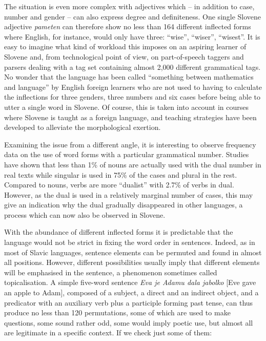 \begin{multicols}{2}
The situation is even more complex with adjectives which – in addition to case, number and gender – can also express degree and definiteness. One single Slovene adjective \textit{pameten} can therefore show no less than 164 different inflected forms where English, for instance, would only have three: ``wise'', ``wiser'', ``wisest''. It is easy to imagine what kind of workload this imposes on an aspiring learner of Slovene and, from technological point of view, on part-of-speech taggers and parsers dealing with a tag set containing almost 2,000 different grammatical tags. No wonder that the language has been called ``something between mathematics and language'' by English foreign learners who are not used to having to calculate the inflections for three genders, three numbers and six cases before being able to utter a single word in Slovene. Of course, this is taken into account in courses where Slovene is taught as a foreign language, and teaching strategies have been developed to alleviate the morphological exertion.


Examining the issue from a different angle, it is interesting to observe frequency data on the use of word forms with a particular grammatical number. Studies have shown that less than 1\% of nouns are actually used with the dual number in real texts while singular is used in 75\% of the cases and plural in the rest. Compared to nouns, verbs are more ``dualist'' with 2.7\% of verbs in dual. However, as the dual is used in a relatively marginal number of cases, this may give an indication why the dual gradually disappeared in other languages, a process which can now also be observed in Slovene.

With the abundance of different inflected forms it is predictable that the language would not be strict in fixing the word order in sentences. Indeed, as in most of Slavic languages, sentence elements can be permuted and found in almost all positions. However, different possibilities usually imply that different elements will be emphasised in the sentence, a phenomenon sometimes called topicalisation. A simple five-word sentence \textit{Eva je Adamu dala jabolko} [Eve gave an apple to Adam], composed of a subject, a direct and an indirect object, and a predicator with an auxiliary verb plus a participle forming past tense, can thus produce no less than 120 permutations, some of which are used to make questions, some sound rather odd, some would imply poetic use, but almost all are legitimate in a specific context. If we check just some of them:


\end{multicols}
